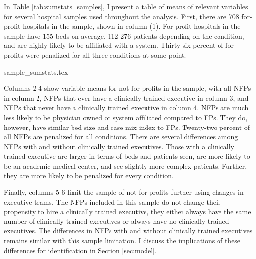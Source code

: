 \documentclass[12pt]{article}
\begin{document}


    In Table \ref{tab:sumstats_samples}, I present a table of means of relevant variables for several hospital samples used throughout the analysis. First, there are 708 for-profit hospitals in the sample, shown in column (1). For-profit hospitals in the sample have 155 beds on average, 112-276 patients depending on the condition, and are highly likely to be affiliated with a system. Thirty six percent of for-profits were penalized for all three conditions at some point. 

    {sample_sumstats.tex}

    Columns 2-4 show variable means for not-for-profits in the sample, with all NFPs in column 2, NFPs that ever have a clinically trained executive in column 3, and NFPs that never have a clinically trained executive in column 4. NFPs are much less likely to be physician owned or system affiliated compared to FPs. They do, however, have similar bed size and case mix index to FPs. Twenty-two percent of all NFPs are penalized for all conditions. There are several differences among NFPs with and without clinically trained executives. Those with a clinically trained executive are larger in terms of beds and patients seen, are more likely to be an academic medical center, and see slightly more complex patients. Further, they are more likely to be penalized for every condition. 

    Finally, columns 5-6 limit the sample of not-for-profits further using changes in executive teams. The NFPs included in this sample do not change their propensity to hire a clinically trained executive, they either always have the same number of clinically trained executives or always have no clinically trained executives. The differences in NFPs with and without clinically trained executives remains similar with this sample limitation. I discuss the implications of these differences for identification in Section \ref{sec:model}. 
\end{document}
